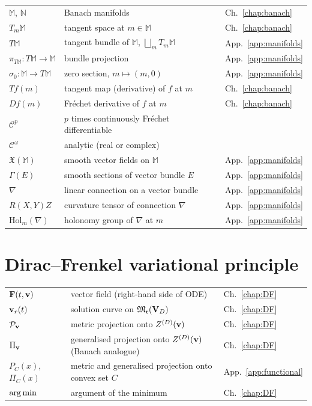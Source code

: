 \begin{tabular}{@{}p{4.5cm}p{7cm}l@{}}
$\mathbb{M}$, $\mathbb{N}$ & Banach manifolds & Ch.~\ref{chap:banach} \\
$T_m\mathbb{M}$ & tangent space at $m \in \mathbb{M}$
    & Ch.~\ref{chap:banach} \\
$T\mathbb{M}$ & tangent bundle of $\mathbb{M}$,
    $\bigsqcup_{m} T_m\mathbb{M}$ & App.~\ref{app:manifolds} \\
$\pi_{T\mathbb{M}}: T\mathbb{M} \to \mathbb{M}$ & bundle projection
    & App.~\ref{app:manifolds} \\
$\sigma_0: \mathbb{M} \to T\mathbb{M}$ & zero section,
    $m \mapsto (m,0)$ & App.~\ref{app:manifolds} \\
$Tf(m)$ & tangent map (derivative) of $f$ at $m$
    & Ch.~\ref{chap:banach} \\
$Df(m)$ & Fréchet derivative of $f$ at $m$
    & Ch.~\ref{chap:banach} \\
$\mathcal{C}^p$ & $p$ times continuously Fréchet differentiable & \\
$\mathcal{C}^\omega$ & analytic (real or complex) & \\
$\mathfrak{X}(\mathbb{M})$ & smooth vector fields on $\mathbb{M}$
    & App.~\ref{app:manifolds} \\
$\Gamma(E)$ & smooth sections of vector bundle $E$
    & App.~\ref{app:manifolds} \\
$\nabla$ & linear connection on a vector bundle
    & App.~\ref{app:manifolds} \\
$R(X,Y)Z$ & curvature tensor of connection $\nabla$
    & App.~\ref{app:manifolds} \\
$\mathrm{Hol}_m(\nabla)$ & holonomy group of $\nabla$ at $m$
    & App.~\ref{app:manifolds} \\
\end{tabular}

\section*{Dirac--Frenkel variational principle}

\begin{tabular}{@{}p{4.5cm}p{7cm}l@{}}
$\mathbf{F}(t,\mathbf{v})$ & vector field (right-hand side of ODE)
    & Ch.~\ref{chap:DF} \\
$\mathbf{v}_r(t)$ & solution curve on $\mathfrak{M}_{\mathfrak{r}}(\mathbf{V}_D)$
    & Ch.~\ref{chap:DF} \\
$\mathcal{P}_{\mathbf{v}}$ & metric projection onto $Z^{(D)}(\mathbf{v})$
    & Ch.~\ref{chap:DF} \\
$\Pi_{\mathbf{v}}$ & generalised projection onto $Z^{(D)}(\mathbf{v})$ (Banach analogue)
    & Ch.~\ref{chap:DF} \\
$P_C(x)$, $\Pi_C(x)$ & metric and generalised projection onto
    convex set $C$ & App.~\ref{app:functional} \\
$\operatorname*{arg\,min}$ & argument of the minimum & Ch.~\ref{chap:DF} \\
\end{tabular}

